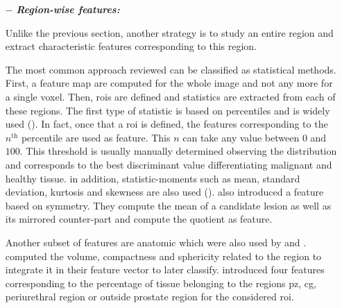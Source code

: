 \begin{enumerate}[leftmargin=*]
\item[$-$] \textbf{\textit{Region-wise features:}}

Unlike the previous section, another strategy is to study an entire region and extract characteristic features corresponding to this region.

The most common approach reviewed can be classified as statistical methods. First, a feature map are computed for the whole image and not any more for a single voxel. Then, \acp{roi} are defined and statistics are extracted from each of these regions. The first type of statistic is based on percentiles and is widely used (\cite{Antic2013,Litjens2011,Litjens2012,Litjens2014,Peng2013,Tiwari2009a,Tiwari2010,Tiwari2013,Viswanath2008,Viswanath2008a,Viswanath2011,Viswanath2012,Vos2008,Vos2008a,Vos2010,Vos2012}). In fact, once that a \ac{roi} is defined, the features corresponding to the $n^{\text{th}}$ percentile are used as feature. This $n$ can take any value between $0$ and $100$. This threshold is usually manually determined observing the distribution and corresponds to the best discriminant value differentiating malignant and healthy tissue. in addition, statistic-moments such as mean, standard deviation, kurtosis and skewness are also used (\cite{Ampeliotis2007,Ampeliotis2008,Antic2013,Niaf2011,Niaf2012,Peng2013}). \cite{Litjens2014} also introduced a feature based on symmetry. They compute the mean of a candidate lesion as well as its mirrored counter-part and compute the quotient as feature.

Another subset of features are anatomic which were also used by \cite{Litjens2012,Litjens2014} and \cite{Matulewicz2013}. \cite{Litjens2012,Litjens2014} computed the volume, compactness and sphericity related to the region to integrate it in their feature vector to later classify. \cite{Matulewicz2013} introduced four features corresponding to the percentage of tissue belonging to the regions \ac{pz}, \ac{cg}, periurethral region or outside prostate region for the considered \ac{roi}.


\end{enumerate}
